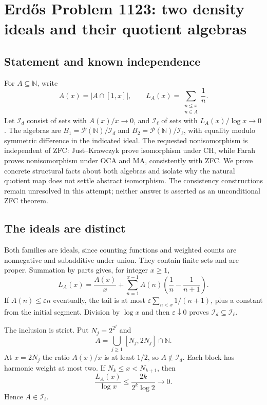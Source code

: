 \section*{Erd\H{o}s Problem 1123: two density ideals and their quotient algebras}
\subsection*{Statement and known independence}
For $A\subseteq\mathbb N$, write
\[
 A(x)=|A\cap[1,x]|,\qquad L_A(x)=\sum_{\substack{n\le x\\n\in A}}\frac1n.
\]
Let $\mathcal I_d$ consist of sets with $A(x)/x\to0$, and $\mathcal I_\ell$ of sets with $L_A(x)/\log x\to0$. The algebras are $B_1=\mathcal P(\mathbb N)/\mathcal I_d$ and $B_2=\mathcal P(\mathbb N)/\mathcal I_\ell$, with equality modulo symmetric difference in the indicated ideal.
The requested nonisomorphism is independent of ZFC: Just--Krawczyk prove isomorphism under CH, while Farah proves nonisomorphism under OCA and MA, consistently with ZFC. We prove concrete structural facts about both algebras and isolate why the natural quotient map does not settle abstract isomorphism. The consistency constructions remain unresolved in this attempt; neither answer is asserted as an unconditional ZFC theorem.

\subsection*{The ideals are distinct}
Both families are ideals, since counting functions and weighted counts are nonnegative and subadditive under union. They contain finite sets and are proper. Summation by parts gives, for integer $x\ge1$,
\[
 L_A(x)=\frac{A(x)}x+\sum_{n=1}^{x-1}A(n)\left(\frac1n-\frac1{n+1}\right).
\]
If $A(n)\le\varepsilon n$ eventually, the tail is at most $\varepsilon\sum_{n<x}1/(n+1)$, plus a constant from the initial segment. Division by $\log x$ and then $\varepsilon\downarrow0$ proves $\mathcal I_d\subseteq\mathcal I_\ell$.

The inclusion is strict. Put $N_j=2^{2^j}$ and
\[
 A=\bigcup_{j\ge1}[N_j,2N_j]\cap\mathbb N.
\]
At $x=2N_j$ the ratio $A(x)/x$ is at least $1/2$, so $A\notin\mathcal I_d$. Each block has harmonic weight at most two. If $N_k\le x<N_{k+1}$, then
\[
 \frac{L_A(x)}{\log x}\le\frac{2k}{2^k\log2}\longrightarrow0.
\]
Hence $A\in\mathcal I_\ell$.

